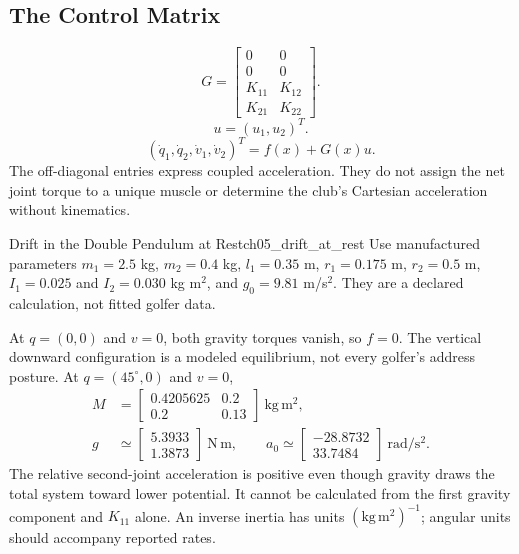 \subsection*{The Control Matrix}
\begin{equation}
 G=\begin{bmatrix}0&0\\0&0\\K_{11}&K_{12}\\K_{21}&K_{22}\end{bmatrix}.
\label{eq:ch05_control_matrix}
\end{equation}
\begin{equation}
 u=(u_1,u_2)^T.
\label{eq:ch05_control_input}
\end{equation}
\begin{equation}
 (\dot q_1,\dot q_2,\dot v_1,\dot v_2)^T=f(x)+G(x)u.
\label{eq:ch05_full_affine}
\end{equation}
The off-diagonal entries express coupled acceleration. They do not assign the net joint torque to a unique muscle or determine the club's Cartesian acceleration without kinematics.

\begin{example}{Drift in the Double Pendulum at Rest}{ch05_drift_at_rest}
Use manufactured parameters $m_1=2.5$ kg, $m_2=0.4$ kg, $l_1=0.35$ m, $r_1=0.175$ m, $r_2=0.5$ m, $I_1=0.025$ and $I_2=0.030$ kg m$^2$, and $g_0=9.81$ m/s$^2$. They are a declared calculation, not fitted golfer data.

At $q=(0,0)$ and $v=0$, both gravity torques vanish, so $f=0$. The vertical downward configuration is a modeled equilibrium, not every golfer's address posture. At $q=(45^\circ,0)$ and $v=0$,
\[
 \begin{aligned}
 M&=\begin{bmatrix}0.4205625&0.2\\0.2&0.13\end{bmatrix}\ \mathrm{kg\,m^2},\\
 g&\simeq\begin{bmatrix}5.3933\\1.3873\end{bmatrix}\ \mathrm{N\,m},\qquad
 a_0\simeq\begin{bmatrix}-28.8732\\33.7484\end{bmatrix}\ \mathrm{rad/s^2}.
 \end{aligned}
\]
The relative second-joint acceleration is positive even though gravity draws the total system toward lower potential. It cannot be calculated from the first gravity component and $K_{11}$ alone. An inverse inertia has units $(\mathrm{kg\,m^2})^{-1}$; angular units should accompany reported rates.
\end{example}

